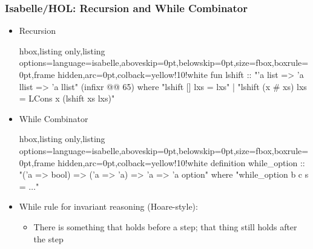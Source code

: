 \documentclass[aspectratio=169,10pt]{beamer}
\begin{document}
\begin{frame}[fragile]
  \frametitle{Isabelle/HOL: Recursion and While Combinator}
  \begin{itemize}
    \item Recursion
          \begin{tcblisting}{hbox,listing only,listing options={language=isabelle,aboveskip=0pt,belowskip=0pt},size=fbox,boxrule=0pt,frame hidden,arc=0pt,colback=yellow!10!white}
fun lshift :: "'a list => 'a llist => 'a llist" (infixr @@ 65) where
  "lshift [] lxs = lxs"
| "lshift (x # xs) lxs = LCons x (lshift xs lxs)"
          \end{tcblisting}
    \item While Combinator
          \begin{tcblisting}{hbox,listing only,listing options={language=isabelle,aboveskip=0pt,belowskip=0pt},size=fbox,boxrule=0pt,frame hidden,arc=0pt,colback=yellow!10!white}
definition while_option :: "('a => bool) => ('a => 'a) => 'a => 'a option" where
"while_option b c s = $\ldots$"
          \end{tcblisting}
    \item While rule for invariant reasoning (Hoare-style):
          \begin{itemize}
            \item There is something that holds before a step; that thing still holds after the step
          \end{itemize}
  \end{itemize}
\end{frame}
\end{document}
